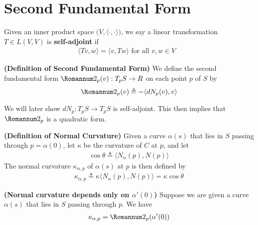 \documentclass{report}
\begin{document}
\section{Second Fundamental Form}
\begin{mdframed}
  Given an inner product space $\Big(V, \langle \cdot,\cdot\rangle  \Big)$, we say a linear transformation $T\in L(V,V)$ is \textbf{self-adjoint} if 
\begin{align*}
\langle Tv,w\rangle = \langle v,Tw\rangle \text{ for all $v,w\in V$ }
\end{align*}
\end{mdframed}
\begin{definition}
  \textbf{(Definition of Second Fundamental Form)} We define the second fundamental form $\Sec_p(v):T_pS\rightarrow R$ on each point $p$ of $S$ by  
\begin{align*}
\Sec _p(v)\triangleq - \langle dN_p(v),v\rangle 
\end{align*}
\end{definition}
\begin{mdframed}
We will later show $dN_p:T_pS\rightarrow T_pS$ is self-adjoint. This then implies that $\Sec_p$ is a quadratic form.
\end{mdframed}
\begin{definition}
\textbf{(Definition of Normal Curvature)} Given a curve $\alpha (s)$ that lies in $S$ passing through $p=\alpha (0)$, let $\kappa$ be the curvature of $C$ at $p$, and let  
\begin{align*}
\cos \theta \triangleq \langle N_\alpha (p),N(p)\rangle 
\end{align*}
The normal curvature $\kappa_{\alpha ,p}$ of $\alpha (s)$ at $p$ is then defined by 
\begin{align*}
\kappa_{\alpha ,p} \triangleq  \kappa \langle N_\alpha (p),N(p)\rangle = \kappa \cos \theta
\end{align*}
\end{definition}
\begin{theorem}
\label{Ncdo}
\textbf{(Normal curvature depends only on $\alpha '(0)$)} Suppose we are given a curve $\alpha (s)$  that lies in $S$ passing through $p$.  We have 
\begin{align*}
\kappa_{\alpha ,p }=\Sec_p(\alpha '(0))
\end{align*}
\end{theorem}
\end{document}
